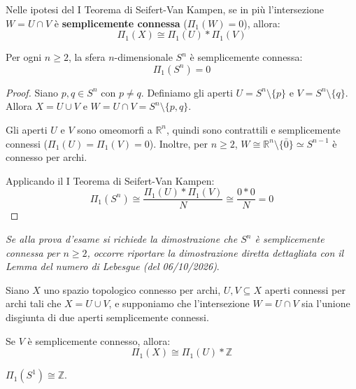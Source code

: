 \begin{coro}
Nelle ipotesi del I Teorema di Seifert-Van Kampen, se in più l'intersezione $W = U \cap V$ è \textbf{semplicemente connessa} ($\Pi_1(W) = 0$), allora:
\[
\Pi_1(X) \cong \Pi_1(U) * \Pi_1(V)
\]
\end{coro}

\begin{coro}
Per ogni $n \geqslant 2$, la sfera $n$-dimensionale $S^n$ è semplicemente connessa:
\[
\Pi_1(S^n) = 0
\]
\end{coro}

\begin{proof}
Siano $p, q \in S^n$ con $p \neq q$. Definiamo gli aperti $U = S^n \setminus \{p\}$ e $V = S^n \setminus \{q\}$.
Allora $X = U \cup V$ e $W = U \cap V = S^n \setminus \{p,q\}$.

Gli aperti $U$ e $V$ sono omeomorfi a $\mathbb{R}^n$, quindi sono contrattili e semplicemente connessi ($\Pi_1(U) = \Pi_1(V) = 0$). Inoltre, per $n \geqslant 2$, $W \cong \mathbb{R}^n \setminus \{\bar{0}\} \simeq S^{n-1}$ è connesso per archi.

Applicando il I Teorema di Seifert-Van Kampen:
\[
\Pi_1(S^n) \cong \frac{\Pi_1(U) * \Pi_1(V)}{N} \cong \frac{0 * 0}{N} = 0
\]
\end{proof}

\begin{notacion}
\textit{Se alla prova d'esame si richiede la dimostrazione che $S^n$ è semplicemente connessa per $n \geqslant 2$, occorre riportare la dimostrazione diretta dettagliata con il Lemma del numero di Lebesgue (del 06/10/2026)}.
\end{notacion}

\vspace{1.5em}

\begin{teo}
Siano $X$ uno spazio topologico connesso per archi, $U, V \subseteq X$ aperti connessi per archi tali che $X = U \cup V$, e supponiamo che l'intersezione $W = U \cap V$ sia l'unione disgiunta di due aperti semplicemente connessi.

Se $V$ è semplicemente connesso, allora:
\[
\Pi_1(X) \cong \Pi_1(U) * \mathbb{Z}
\]
\end{teo}

\begin{coro}
$\Pi_1(S^1) \cong \mathbb{Z}$.
\end{coro}


